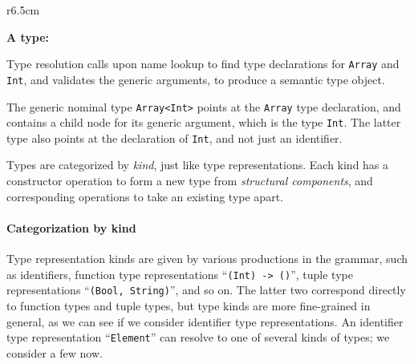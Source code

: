 \documentclass[../generics]{subfiles}
\begin{document}
\medskip

\begin{wrapfigure}[13]{r}{6.5cm}
\begin{center}
\textbf{A type:}
\end{center}
\end{wrapfigure}

Type resolution calls upon name lookup to find type declarations for \texttt{Array} and \texttt{Int}, and validates the generic arguments, to produce a semantic type object.

The generic nominal type \texttt{Array<Int>} points at the \texttt{Array} type declaration, and contains a child node for its generic argument, which is the type \texttt{Int}. The latter type also points at the declaration of \texttt{Int}, and not just an identifier.

Types are categorized by \emph{kind}, just like type representations. Each kind has a constructor operation to form a new type from \emph{structural components}, and corresponding operations to take an existing type apart.

\paragraph{Categorization by kind}
Type representation kinds are given by various productions in the grammar, such as identifiers, function type representations ``\texttt{(Int) -> ()}'', tuple type representations ``\texttt{(Bool, String)}'', and so on. The latter two correspond directly to function types and tuple types, but type kinds are more fine-grained in general, as we can see if we consider identifier type representations. An identifier type representation ``\texttt{Element}'' can resolve to one of several kinds of types; we consider a few now.
\end{document}

